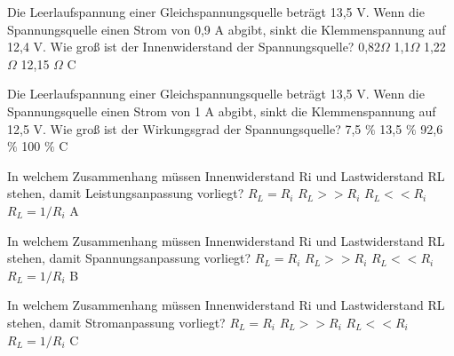 {Die Leerlaufspannung  einer Gleichspannungsquelle beträgt 13,5 V. Wenn die Spannungsquelle einen Strom von 0,9 A abgibt, sinkt die Klemmenspannung auf 12,4 V. Wie groß ist der Innenwiderstand der Spannungsquelle?}%
{0,82$\Omega$}%
{1,1$\Omega$}%
{1,22 $\Omega$}%
{12,15 $\Omega$}%
{C}%

{Die Leerlaufspannung einer Gleichspannungsquelle beträgt 13,5 V. Wenn die Spannungsquelle einen Strom von 1 A abgibt, sinkt die Klemmenspannung auf 12,5 V. Wie groß ist der Wirkungsgrad der Spannungsquelle?}%
{7,5 $\%$}%
{13,5 $\%$}%
{92,6 $\%$}%
{100 $\%$}%
{C}%

{In welchem Zusammenhang müssen Innenwiderstand Ri und Lastwiderstand RL stehen, damit Leistungsanpassung vorliegt?}%
{$R_L = R_i$}%
{$R_L >> R_i$}%
{$R_L << R_i$}%
{$R_L = 1/R_i$}%
{A}%

{In welchem Zusammenhang müssen Innenwiderstand Ri und Lastwiderstand RL stehen, damit Spannungsanpassung vorliegt?}%
{$R_L = R_i$}%
{$R_L >> R_i$}%
{$R_L << R_i$}%
{$R_L = 1/R_i$}%
{B}%

{In welchem Zusammenhang müssen Innenwiderstand Ri und Lastwiderstand RL stehen, damit Stromanpassung vorliegt?}%
{$R_L = R_i$}%
{$R_L >> R_i$}%
{$R_L << R_i$}%
{$R_L = 1/R_i$}%
{C}%